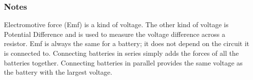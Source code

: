 \subsubsection*{Notes}
Electromotive force (Emf) is a kind of voltage. The other kind of voltage is Potential Difference and is used to measure the voltage difference across a resistor. Emf is always the same for a battery; it does not depend on the circuit it is connected to. Connecting batteries in series simply adds the forces of all the batteries together. Connecting batteries in parallel provides the same voltage as the battery with the largest voltage.
